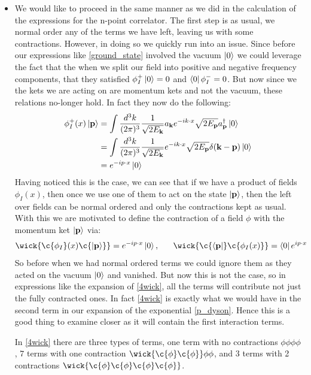 \documentclass[11pt]{article}
\numberwithin{equation}{section}
\begin{document}
\begin{itemize}
\item We would like to proceed in the same manner as we did in the calculation of the expressions for the n-point correlator. The first step is as usual, we normal order any of the terms we have left, leaving us with some contractions. However, in doing so we quickly run into an issue. Since before our expressions like \ref{ground_state} involved the vacuum $\ket{0}$ we could leverage the fact that the when we split our field into positive and negative frequency components, that they satisfied $\phi_I^+\ket{0} =0$ and $\bra{0}\phi_I^-= 0$. But now since we the kets we are acting on are momentum kets and not the vacuum, these relations no-longer hold. In fact they now do the following:
\begin{align*}
   \phi^{+}_I(x)\ket{\textbf{p}} &= \int \frac{d^3k}{(2\pi)^3}\frac{1}{\sqrt{2E_{\textbf{k}}}}a_{\textbf{k}}e^{-ik \cdot x}\sqrt{2E_{\textbf{p}}}a^{\dagger}_{\textbf{p}}\ket{0} \\
   & = \int \frac{d^3k}{(2\pi)^3}\frac{1}{\sqrt{2E_{\textbf{k}}}}e^{-ik \cdot x}\sqrt{2E_{\textbf{p}}}\delta(\textbf{k}-\textbf{p})\ket{0} \\
   &= e^{-ip\cdot x}\ket{0 }
 \end{align*} 
Having noticed this is the case, we can see that if we have a product of fields $\phi_I(x)$, then once we use one of them to act on the state $\ket{\textbf{p}}$, then the left over fields can be normal ordered and only the contractions kept as usual. With this we are motivated to define the contraction of a field $\phi$ with the momentum ket $\ket{\textbf{p}}$ via:
\begin{align*}
  \wick{\c{\phi_I}(x) \c{\ket{\textbf{p}}}} = e^{-ip\cdot x}\ket{0}, ~~~~~\wick{\c{\bra{\textbf{p}}} \c{\phi_I(x)}} = \bra{0}e^{ip\cdot x}
\end{align*}
So before when we had normal ordered terms we could ignore them as they acted on the vacuum $\ket{0}$ and vanished. But now this is not the case, so in expressions like the expansion of \ref{4wick}, all the terms will contribute not just the fully contracted ones. In fact \ref{4wick} is exactly what we would have in the second term in our expansion of the exponential \ref{p_dyson}. Hence this is a good thing to examine closer as it will contain the first interaction terms. 


In \ref{4wick} there are three types of terms, one term with no contractions $\phi\phi\phi\phi$, $7$ terms with one contraction $\wick{\c{\phi}\c{\phi}}\phi\phi$, and $3$ terms with 2 contractions $\wick{\c{\phi}\c{\phi}\c{\phi}\c{\phi}}$. 


\end{itemize}
\end{document}
